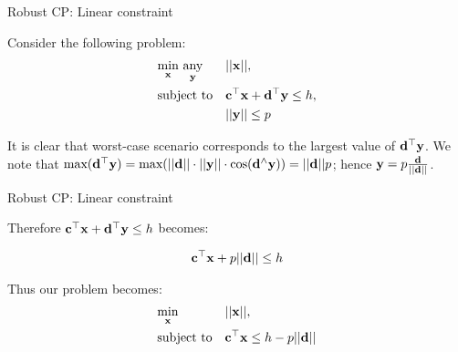 \documentclass{beamer}
\begin{document}
\begin{frame}{Robust CP: Linear constraint}
\begin{flushleft}

Consider the following problem:
%
\begin{equation}
\begin{aligned}
& \underset{\mathbf{x}}{\text{min}} \ \underset{\mathbf{y}}{\text{any}}
& & ||\mathbf{x}||, \\
& \text{subject to}
& & \mathbf{c}^\top \mathbf{x} + \mathbf{d}^\top \mathbf{y} \leq h, \\
& & & ||\mathbf{y}|| \leq p
\end{aligned}
\end{equation}

It is clear that worst-case scenario corresponds to the largest value of $\mathbf{d}^\top \mathbf{y}$. We note that $\text{max}(\mathbf{d}^\top \mathbf{y}) = \text{max}(||\mathbf{d}|| \cdot ||\mathbf{y}|| \cdot \text{cos}(\mathbf{d}^\wedge \mathbf{y})) =  ||\mathbf{d}|| p$; hence $\mathbf{y} =  p \frac{\mathbf{d}}{|| \mathbf{d} ||} $.

 
\end{flushleft}
\end{frame}



\begin{frame}{Robust CP: Linear constraint}
\begin{flushleft}

Therefore $\mathbf{c}^\top \mathbf{x} + \mathbf{d}^\top \mathbf{y} \leq h$ becomes:

\begin{align}
    \mathbf{c}^\top \mathbf{x} + p || \mathbf{d} || \leq h 
\end{align}

\bigskip

Thus our problem becomes:
%
\begin{equation}
\begin{aligned}
& \underset{\mathbf{x}}{\text{min}}
& & ||\mathbf{x}||, \\
& \text{subject to}
& & \mathbf{c}^\top \mathbf{x} \leq h - p || \mathbf{d} ||
\end{aligned}
\end{equation}
 
\end{flushleft}
\end{frame}
\end{document}
